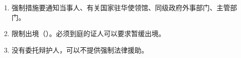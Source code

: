 \begin{enumerate}
\begin{enumerate}
\begin{enumerate}
                  \item 诉讼文书以中文文本为准，应当附有外文的译本。
                  \item 判决书为中文文本。
                \end{enumerate}
          \item 强制措施要通知当事人、有关国家驻华使领馆、同级政府外事部门、主管部门。
          \item 限制出境（）。必须到庭的证人可以要求暂缓出境。
          \item 没有委托辩护人，可以不提供强制法律援助。
        \end{enumerate}
\end{enumerate}
